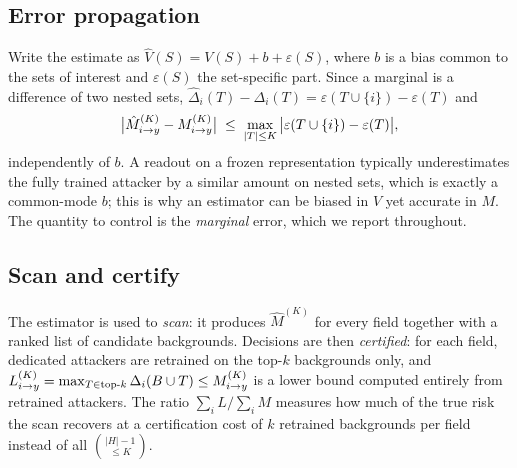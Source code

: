 \subsection{Error propagation}
Write the estimate as $\hat V(S)=V(S)+b+\varepsilon(S)$, where $b$ is a bias common to the sets
of interest and $\varepsilon(S)$ the set-specific part. Since a marginal is a difference of two
nested sets, $\hat\Delta_i(T)-\Delta_i(T)=\varepsilon(T\cup\{i\})-\varepsilon(T)$ and
\begin{equation}\label{eq:prop}
\big|\hat M^{(K)}_{i\to y} - M^{(K)}_{i\to y}\big| \;\le\; \max_{|T|\le K}\big|\varepsilon(T\cup\{i\})-\varepsilon(T)\big|,
\end{equation}
independently of $b$. A readout on a frozen representation typically underestimates the fully
trained attacker by a similar amount on nested sets, which is exactly a common-mode $b$; this is
why an estimator can be biased in $V$ yet accurate in $M$. The quantity to control is the
\emph{marginal} error, which we report throughout.

\subsection{Scan and certify}\label{sec:scan}
The estimator is used to \emph{scan}: it produces $\hat M^{(K)}$ for every field together with a
ranked list of candidate backgrounds. Decisions are then \emph{certified}: for each field,
dedicated attackers are retrained on the top-$k$ backgrounds only, and
$L^{(K)}_{i\to y}=\max_{T\in\text{top-}k}\Delta_i(B\cup T)\le M^{(K)}_{i\to y}$ is a lower bound computed
entirely from retrained attackers. The ratio $\sum_i L/\sum_i M$ measures how much of the true
risk the scan recovers at a certification cost of $k$ retrained backgrounds per field instead
of all $\binom{|H|-1}{\le K}$.
